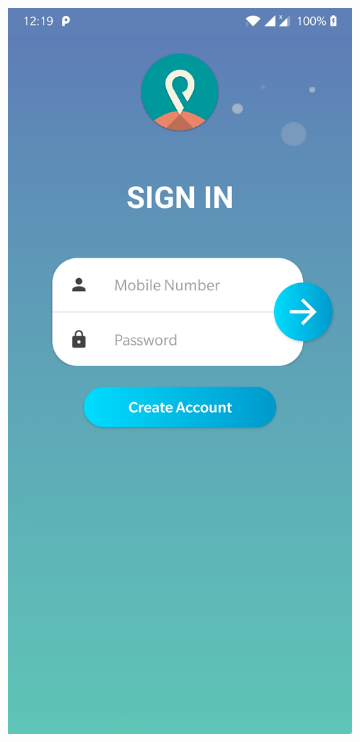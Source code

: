 \documentclass[12pt, english]{article}
\begin{document}
\begin{figure}[h!]
    \centering
    \begin{subfigure}[t]{0.4\textwidth}
    \includegraphics[width=\linewidth]{LogIn/LoginActivity.jpg}

\end{subfigure}
\end{figure}
\end{document}
